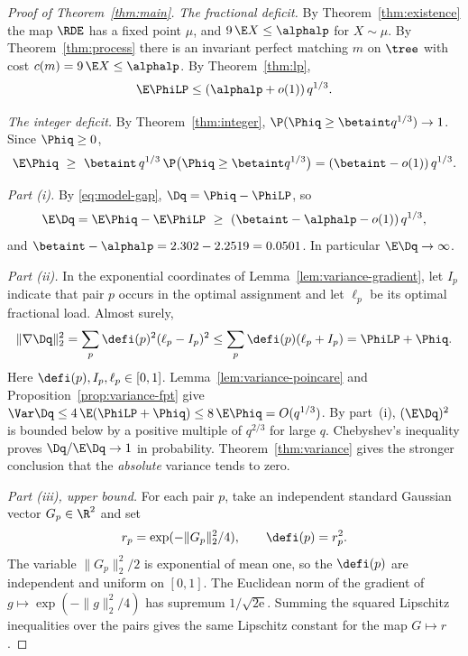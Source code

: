 \begin{proof}[Proof of Theorem~\ref{thm:main}]
\emph{The fractional deficit.} By Theorem~\ref{thm:existence} the map $\RDE$ has a fixed
point $\mu$, and $9\,\E X\le\alphalp$ for $X\sim\mu$. By Theorem~\ref{thm:process} there is
an invariant perfect matching $m$ on $\tree$ with cost $c(m)=9\,\E X\le\alphalp$. By
Theorem~\ref{thm:lp},
\[
\E\PhiLP\le(\alphalp+o(1))\,q^{1/3}.
\]

\emph{The integer deficit.} By Theorem~\ref{thm:integer},
$\P(\Phiq\ge\betaint q^{1/3})\to1$. Since $\Phiq\ge0$,
\[
\E\Phiq\ \ge\ \betaint\,q^{1/3}\,\P\bigl(\Phiq\ge\betaint q^{1/3}\bigr)
=(\betaint-o(1))\,q^{1/3}.
\]

\emph{Part \textup{(i)}.} By \eqref{eq:model-gap}, $\Dq=\Phiq-\PhiLP$, so
\[
\E\Dq=\E\Phiq-\E\PhiLP\ \ge\ (\betaint-\alphalp-o(1))\,q^{1/3},
\]
and $\betaint-\alphalp=2.302-2.2519=0.0501$. In particular $\E\Dq\to\infty$.

\emph{Part \textup{(ii)}.} In the exponential coordinates of
Lemma~\ref{lem:variance-gradient}, let $I_p$ indicate that pair $p$ occurs in the
optimal assignment and let $\ell_p$ be its optimal fractional load. Almost surely,
\[
\lVert\nabla\Dq\rVert_2^2
=\sum_p \defi(p)^2(\ell_p-I_p)^2
\le \sum_p \defi(p)(\ell_p+I_p)=\PhiLP+\Phiq .
\]
Here $\defi(p),I_p,\ell_p\in[0,1]$. Lemma~\ref{lem:variance-poincare} and
Proposition~\ref{prop:variance-fpt} give
$\Var\Dq\le 4\,\E(\PhiLP+\Phiq)\le 8\,\E\Phiq=O(q^{1/3})$.
By part~(i), $(\E\Dq)^2$ is bounded below by a positive multiple of $q^{2/3}$ for
large $q$. Chebyshev's inequality proves $\Dq/\E\Dq\to 1$ in probability.
Theorem~\ref{thm:variance} gives the stronger conclusion that the \emph{absolute}
variance tends to zero.

\emph{Part \textup{(iii)}, upper bound.} For each pair $p$, take an independent
standard Gaussian vector $G_p\in\R^2$ and set
\[
r_p=\exp(-\lVert G_p\rVert_2^2/4),\qquad \defi(p)=r_p^2 .
\]
The variable $\lVert G_p\rVert_2^2/2$ is exponential of mean one, so the
$\defi(p)$ are independent and uniform on $[0,1]$. The Euclidean norm of the
gradient of $g\mapsto\exp(-\lVert g\rVert_2^2/4)$ has supremum
$1/\sqrt{2\mathrm e}$. Summing the squared Lipschitz inequalities over the
pairs gives the same Lipschitz constant for the map $G\mapsto r$.


\end{proof}
